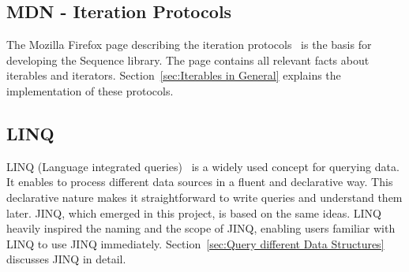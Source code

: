 \subsection{MDN - Iteration Protocols}
\label{sub:MDN - Iteration Protocols}
The Mozilla Firefox page describing the iteration
protocols~\cite{mdn_protocols} is the basis for developing the Sequence
library. The page contains all relevant facts about iterables and iterators.
Section~\ref{sec:Iterables in General} explains the implementation
of these protocols.

\subsection{LINQ}
\label{sub:LINQ}
LINQ (Language integrated queries)~\cite{billwagner_language-integrated_2023}
is a widely used concept for querying data. It enables to process different
data sources in a fluent and declarative way. This declarative nature makes it
straightforward to write queries and understand them later. JINQ, which emerged
in this project, is based on the same ideas. LINQ heavily inspired the naming
and the scope of JINQ, enabling users familiar with LINQ to use JINQ
immediately. Section~\ref{sec:Query different Data Structures} discusses JINQ
in detail.

